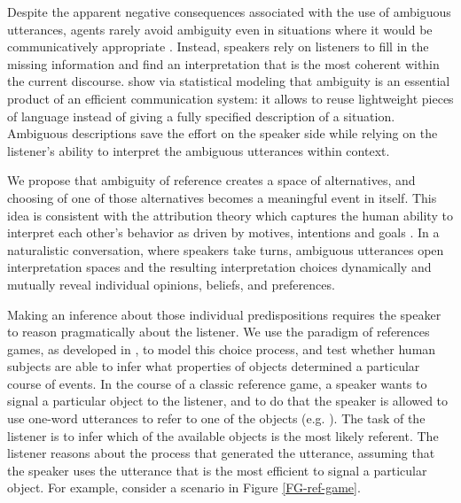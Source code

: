 \documentclass[10pt,a4paper]{article}
\begin{document}
Despite the apparent negative consequences associated with the use of ambiguous utterances, agents rarely avoid ambiguity even in situations where it would be communicatively appropriate \cite{wasow2015, ferreira2008}. Instead, speakers rely on listeners to fill in the missing information and find an interpretation that is the most coherent within the current discourse.   show via statistical modeling that ambiguity is an essential product of an efficient communication system: it allows to reuse lightweight pieces of language instead of giving a fully specified description of a situation. Ambiguous descriptions save the effort on the speaker side while relying on the listener's ability to interpret the ambiguous utterances within context.

We propose that ambiguity of reference creates a space of alternatives, and choosing of one of those alternatives becomes a meaningful event in itself. This idea is consistent with the attribution theory which captures the human ability to interpret each other's behavior as driven by motives, intentions and goals \cite{jones1965acts, kelley1967attribution, kelley1970social}.
 In a naturalistic conversation, where speakers take turns, ambiguous utterances open interpretation spaces and the resulting interpretation choices dynamically and mutually reveal individual opinions, beliefs, and preferences. 
 
 Making an inference about those individual predispositions requires the speaker to reason pragmatically about the listener.
We use the paradigm of references games, as developed in , to model this choice process, and test whether human subjects are able to infer what properties of objects determined a particular course of events. In the course of a classic reference game, a speaker wants to signal a particular object to the listener, and to do that the speaker is allowed to use one-word utterances to refer to one of the objects (e.g. ). The task of the listener is to infer which of the available objects is the most likely referent. The listener reasons about the process that generated the utterance, assuming that the speaker uses the utterance that is the most efficient to signal a particular object. For example, consider a scenario in  Figure \ref{FG-ref-game}.
\end{document}

